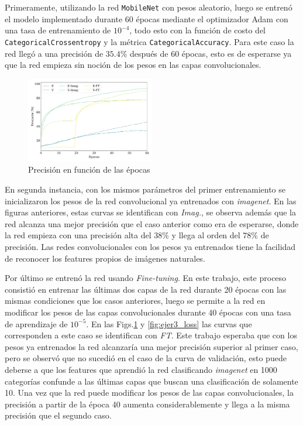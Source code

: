     Primeramente, utilizando la red \verb|MobileNet| con pesos aleatorio, luego se entrenó el modelo implementado durante 60 épocas mediante el optimizador Adam con una tasa de entrenamiento de $10^{-4}$, todo esto con la función de costo del \verb|CategoricalCrossentropy| y la métrica \verb|CategoricalAccuracy|. Para este caso la red llegó a una precisión de  $35.4\%$ después de 60 épocas, esto es de esperarse ya que la red empieza sin noción de los pesos en las capas convolucionales.
    \begin{figure}[H]
        \begin{small}
            \begin{center}
                \includegraphics[width=0.5\textwidth]{Figs/ejer3_acc.pdf}
            \end{center}
            \caption{Precisión en función de las épocas}
            \label{fig:ejer3_acc}
        \end{small}
    \end{figure}
    En segunda instancia, con los mismos parámetros del primer entrenamiento se inicializaron los pesos de la red convolucional ya entrenados con \emph{imagenet}. En las figuras anteriores, estas curvas se identifican con \emph{Imag.}, se observa además que la red alcanza una mejor precisión  que el caso anterior como era de esperarse, donde la red empieza con una precisión alta del $38\%$ y llega al orden del $78\%$ de precisión. Las redes convolucionales con los pesos ya entrenados tiene la facilidad de reconocer los features propios de imágenes naturales.  


    Por último se entrenó la red usando \emph{Fine-tuning}. En este trabajo, este proceso consistió en entrenar las últimas dos capas de la red durante 20 épocas con las mismas condiciones que los casos anteriores, luego se permite a la red en modificar los pesos de las capas convolucionales durante 40 épocas con una tasa de aprendizaje de $10^{-5}$.  En las Figs.\ref{fig:ejer3_acc} y \ref{fig:ejer3_loss} las curvas que corresponden a este caso se identifican con \emph{FT}. Este trabajo esperaba que con los pesos ya entrenados la red alcanzaría una mejor precisión superior al primer caso, pero se observó que no sucedió en el caso de la curva de validación, esto puede deberse a que los features que aprendió la red clasificando \emph{imagenet} en 1000 categorías confunde a las últimas capas que buscan una clasificación de solamente 10.  Una vez que la red puede modificar  los pesos de las capas convolucionales, la precisión a partir de la época 40 aumenta considerablemente y llega a la misma precisión que el segundo caso. 


